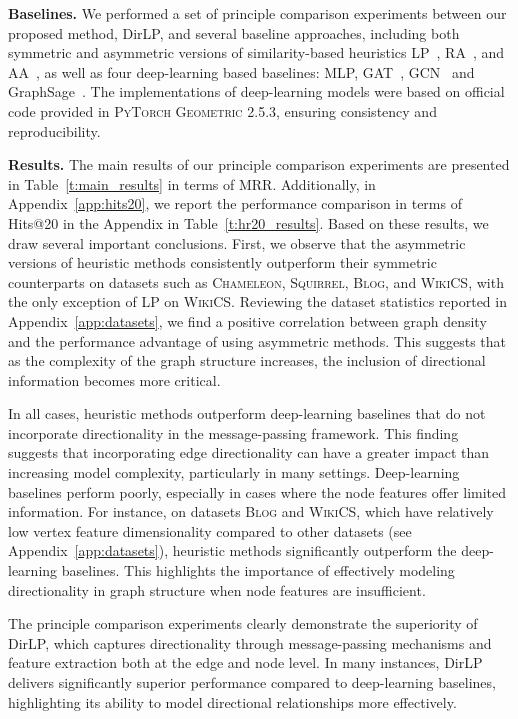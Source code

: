 \documentclass{article}
\begin{document}
\textbf{Baselines.} We performed a set of principle comparison experiments between our proposed method, DirLP, and several baseline approaches, including both symmetric and asymmetric versions of similarity-based heuristics LP~\citep{lu2009similarity}, RA~\citep{zhou2009predicting}, and AA~\citep{adamic2003friends}, as well as four deep-learning based baselines: MLP, GAT~\citep{velivckovic2017graph}, GCN~\citep{kipf2016semi} and GraphSage~\citep{hamilton2017inductive}. The implementations of deep-learning models were based on official code provided in \textsc{PyTorch Geometric 2.5.3}, ensuring consistency and reproducibility. 

\textbf{Results.} The main results of our principle comparison experiments are presented in Table~\ref{t:main_results} in terms of MRR. Additionally, in Appendix~\ref{app:hits20}, we report the performance comparison in terms of Hits@20 in the Appendix in Table~\ref{t:hr20_results}. Based on these results, we draw several important conclusions. First, we observe that the asymmetric versions of heuristic methods consistently outperform their symmetric counterparts on datasets such as \textsc{Chameleon}, \textsc{Squirrel}, \textsc{Blog}, and \textsc{WikiCS}, with the only exception of LP on \textsc{WikiCS}. Reviewing the dataset statistics reported in Appendix~\ref{app:datasets}, we find a positive correlation between graph density and the performance advantage of using asymmetric methods. This suggests that as the complexity of the graph structure increases, the inclusion of directional information becomes more critical.

In all cases, heuristic methods outperform deep-learning baselines that do not incorporate directionality in the message-passing framework. This finding suggests that incorporating edge directionality can have a greater impact than increasing model complexity, particularly in many settings. Deep-learning baselines perform poorly, especially in cases where the node features offer limited information. For instance, on datasets \textsc{Blog} and \textsc{WikiCS}, which have relatively low vertex feature dimensionality compared to other datasets (see Appendix~\ref{app:datasets}), heuristic methods significantly outperform the deep-learning baselines. This highlights the importance of effectively modeling directionality in graph structure when node features are insufficient.

The principle comparison experiments clearly demonstrate the superiority of DirLP, which captures directionality through message-passing mechanisms and feature extraction both at the edge and node level. In many instances, DirLP delivers significantly superior performance compared to deep-learning baselines, highlighting its ability to model directional relationships more effectively. 
\end{document}
